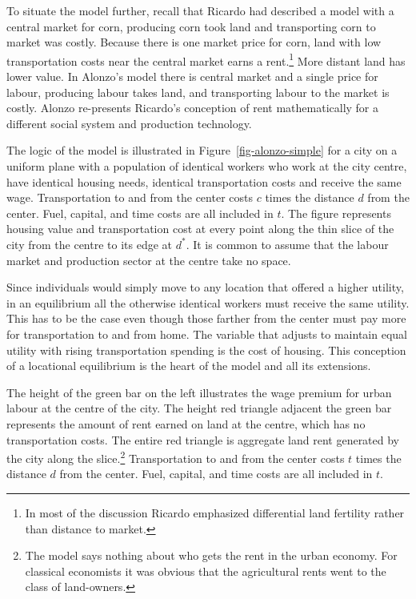 To situate the model further, recall that Ricardo had described a model with a central market for corn, producing corn took land and transporting corn to market was costly. Because there is one market price for corn, land with low transportation costs near the central market earns a rent.\footnote{In most of the discussion Ricardo emphasized  differential land fertility rather than distance to market.} More distant land has lower value. In Alonzo's model there is central market and a single price for labour, producing labour takes land, and transporting labour to the market is costly. Alonzo re-presents Ricardo's conception of rent  mathematically for a different social system and production technology.  

The logic of the model is illustrated in Figure~\ref{fig-alonzo-simple} for a city on a uniform plane with a population of identical workers who work at the city centre, have identical housing needs, identical transportation costs and receive the same wage. Transportation to and from the center costs ${c}$ times the distance $d$ from the center. Fuel, capital, and time costs are  all included in $t$. The figure represents housing value and transportation cost at every point along the thin slice of the city from the centre to its edge at $d^*$.  It is common to assume that the labour market and production sector at the centre take no space. 

 Since individuals would simply move to any location that offered a higher utility, in an equilibrium all the otherwise identical workers must receive the same utility. This has to be the case even though those farther from the center must pay more for transportation to and from home. The variable that  adjusts to maintain equal utility with rising transportation spending is the cost of housing. This conception of a \gls{locational equilibrium} is the heart of the model and all its extensions.

The height of the green bar on the left illustrates the wage premium for urban labour at the centre of the  city. 
The height red triangle adjacent the green bar represents the amount of rent earned on land at the centre, which has no transportation costs. The entire red triangle is aggregate land rent generated by the city along the slice.\footnote{The model says nothing about who gets the rent in the urban economy. For classical economists it was obvious that the agricultural rents went to the class of land-owners.} Transportation to and from the center costs $t$ times the distance $d$ from the center. Fuel, capital, and time costs are  all included in $t$. 

